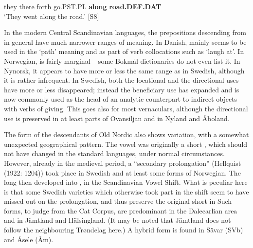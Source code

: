 they  there  forth  go.PST.PL  \textbf{along} \textbf{road.DEF.DAT}\\ %


‘They went along the road.’ [S8]
\z

In the modern Central Scandinavian languages, the prepositions descending from  in general have much narrower ranges of meaning. In Danish, mainly seems to be used in the ‘path’ meaning and as part of verb collocations such as  ‘laugh at’. In Norwegian,  is fairly marginal – some Bokmål dictionaries do not even list it. In Nynorsk, it appears to have more or less the same range as in Swedish, although it is rather infrequent. In Swedish, both the locational and the directional uses have more or less disappeared; instead the beneficiary use has expanded and is now commonly used as the head of an analytic counterpart to indirect objects with verbs of giving. This goes also for most vernaculars, although the directional use is preserved in at least parts of Ovansiljan and in Nyland and Åboland. 

The form of the descendants of Old Nordic  also shows variation, with a somewhat unexpected geographical pattern. The vowel was originally a short , which should not have changed in the standard languages, under normal circumstances. However, already in the medieval period, a “secondary prolongation” (Hellquist (1922: 1204)) took place in Swedish and at least some forms of Norwegian. The long  then developed into , in the Scandinavian Vowel Shift. What is peculiar here is that some Swedish varieties which otherwise took part in the   shift seem to have missed out on the prolongation, and thus preserve the original short in Such forms, to judge from the Cat Corpus, are predominant in the Dalecarlian area and in Jämtland and Hälsingland. (It may be noted that Jämtland does not follow the neighbouring Trøndelag here.) A hybrid form  is found in Sävar (SVb) and Åsele (Åm). 

